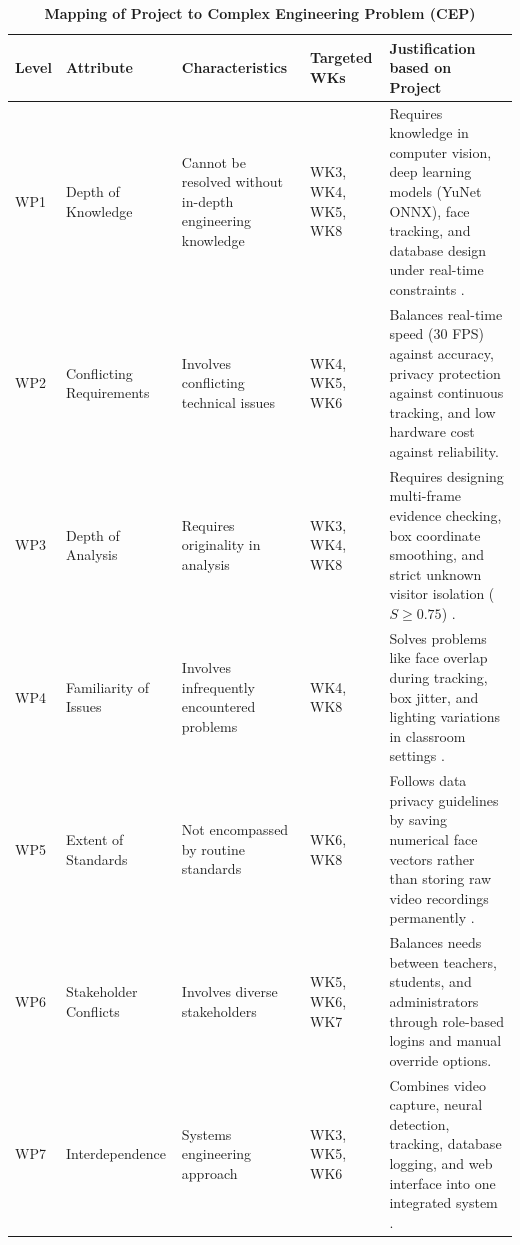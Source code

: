 \documentclass[10pt]{report}
\begin{document}
\begin{table}[H]
\caption{\textbf{Mapping of Project to Complex Engineering Problem (CEP)}}
\label{tab:cep}
\vspace{0.3cm}
\centering
\renewcommand{\arraystretch}{1.3}
\small
\begin{tabular}{|p{1.2cm}|p{2.8cm}|p{4.0cm}|p{2.2cm}|p{4.8cm}|}
\hline
\textbf{Level} & \textbf{Attribute} & \textbf{Characteristics} & \textbf{Targeted WKs} & \textbf{Justification based on Project} \\
\hline
WP1 & Depth of Knowledge & Cannot be resolved without in-depth engineering knowledge & WK3, WK4, WK5, WK8 & Requires knowledge in computer vision, deep learning models (YuNet ONNX), face tracking, and database design under real-time constraints \cite{zhang2023realtime, george2024edgeface}. \\
\hline
WP2 & Conflicting Requirements & Involves conflicting technical issues & WK4, WK5, WK6 & Balances real-time speed (30 FPS) against accuracy, privacy protection against continuous tracking, and low hardware cost against reliability. \\
\hline
WP3 & Depth of Analysis & Requires originality in analysis & WK3, WK4, WK8 & Requires designing multi-frame evidence checking, box coordinate smoothing, and strict unknown visitor isolation ($S \ge 0.75$) \cite{george2024edgeface}. \\
\hline
WP4 & Familiarity of Issues & Involves infrequently encountered problems & WK4, WK8 & Solves problems like face overlap during tracking, box jitter, and lighting variations in classroom settings \cite{booth2023engagement, ghodekar2023activeness}. \\
\hline
WP5 & Extent of Standards & Not encompassed by routine standards & WK6, WK8 & Follows data privacy guidelines by saving numerical face vectors rather than storing raw video recordings permanently \cite{george2024edgeface}. \\
\hline
WP6 & Stakeholder Conflicts & Involves diverse stakeholders & WK5, WK6, WK7 & Balances needs between teachers, students, and administrators through role-based logins and manual override options. \\
\hline
WP7 & Interdependence & Systems engineering approach & WK3, WK5, WK6 & Combines video capture, neural detection, tracking, database logging, and web interface into one integrated system \cite{rajesh2023smart}. \\
\hline
\end{tabular}
\end{table}
\end{document}
